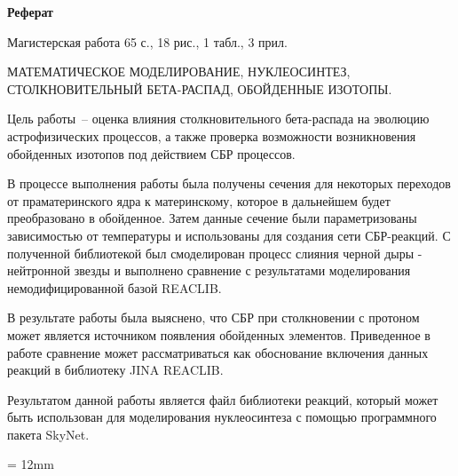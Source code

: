 \documentclass[14pt, a4paper]{article}
\numberwithin{figure}{section}
\numberwithin{equation}{section}
\begin{document}
\newpage%
\addtocounter{page}{1}
\begin{center}
{\normalsize \textbf{Реферат}}
\end{center}

\noindent Магистерская работа 65 с., 18 рис., 1 табл., 3 прил.

\vspace{0.5cm}

\noindent МАТЕМАТИЧЕСКОЕ МОДЕЛИРОВАНИЕ, НУКЛЕОСИНТЕЗ, СТОЛКНОВИТЕЛЬНЫЙ БЕТА-РАСПАД, ОБОЙДЕННЫЕ ИЗОТОПЫ.

\vspace{0.5cm}

\noindent Цель работы~-- оценка влияния столкновительного бета-распада на эволюцию астрофизических процессов, а также проверка возможности возникновения обойденных изотопов под действием СБР процессов.

\noindent В процессе выполнения работы была получены сечения для некоторых переходов от праматеринского ядра к материнскому, которое в дальнейшем будет преобразовано в обойденное. Затем данные сечение были параметризованы зависимостью от температуры и использованы для создания сети СБР-реакций. С полученной библиотекой был смоделирован процесс слияния черной дыры - нейтронной звезды и выполнено сравнение с результатами моделирования немодифицированной базой REACLIB.

\noindent В результате работы была выяснено, что СБР при столкновении с протоном может является источником появления обойденных элементов. Приведенное в работе сравнение может рассматриваться как обоснование включения данных реакций в библиотеку JINA REACLIB.

\noindent Результатом данной работы является файл библиотеки реакций, который может быть использован для моделирования нуклеосинтеза с помощью программного пакета SkyNet.


{}
\parindent = 12mm

\tableofcontents
\end{document}
